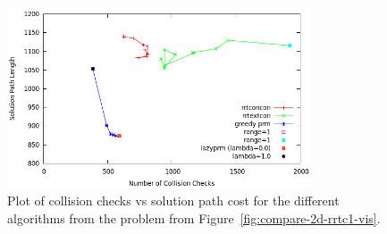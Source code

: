 \begin{figure}
\centering
\includegraphics[width=0.8\textwidth]{figs/compare-2d-rrtc1-medians.png}
\caption{Plot of collision checks vs solution path cost for the
   different algorithms from the problem from
   Figure~\ref{fig:compare-2d-rrtc1-vis}.}
\end{figure}

